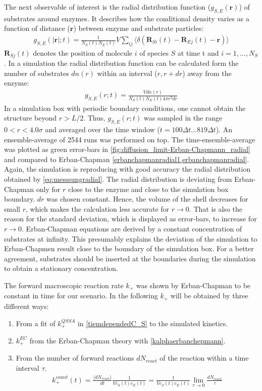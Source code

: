 \documentclass[
  a4paper,BCOR10mm,twoside,
  headsepline,footsepline,%
  fleqn,openbib
]{scrbook}
\begin{document}
The next observable of interest is the radial distribution function ($g_{S,E}(\bm{r})$) of substrates around enzymes. It describes how the conditional density varies as a function of distance ($\bm{r}$) between enzyme and substrate particles:  
\begin{align}
 g_{S,E}(|\bm{r}|;t)=\frac{1}{ N_S (t) N_E(t)} V \sum_{ij} \langle \delta(\bm{R}_{S i}(t)-\bm{R}_{E j}(t)-\bm{r})\rangle
\end{align}
 $\bm{R}_{S j}(t)$ denotes the position of molecule $i$ of species $S$ at time t and $i=1,...,N_{S}$.
In a simulation the radial distribution function can be calculated form the number of substrates $dn(r)$ within an interval ($r,r+dr$) away from the enzyme:
\begin{align} 
 g_{S,E}(r;t)=\frac{V dn(r)}{  N_S (t) N_E(t) 4\pi r^2 dr} \label{eq:messsungradial}
\end{align}
In a simulation box with periodic boundary conditions, one cannot obtain the structure beyond $r>L/2$. Thus, $g_{S,E}(r;t)$ was sampled in the range $0 <r<4.0 \sigma$ and averaged over the time window ($t=100 \Delta t ...819 \Delta t$). An ensemble-average of 2544 runs was performed on top. The time-ensemble-average was plotted as green error-bars in \cref{fig:diffusion_limit-Erban-Chapmann_radial} and compared to Erban-Chapman \cref{erbanchapmanradial1,erbanchapmanradial}. Again, the simulation is reproducing with good accuracy the radial distribution obtained by \cref{eq:messsungradial}. The radial distribution is deviating from Erban-Chapman only for $r$ close to the enzyme and close to the simulation box boundary. $dr$ was chosen constant. Hence, the volume of the shell decreases for small $r$, which makes the calculation less accurate for $r\rightarrow 0$. That is also the reason for the standard deviation, which is displayed as error-bars, to increase for $r\rightarrow 0$.  Erban-Chapman equations are derived by a constant concentration of substrates at infinity. This presumably explains the deviation of the simulation to Erban-Chapmen result close to the boundary of the simulation box. For a better agreement, substrates should be inserted at the boundaries during the simulation to obtain a stationary concentration. 
\par 
The forward macroscopic reaction rate $k_+$ was shown by Erban-Chapman to be constant in time for our scenario. In the following $k_+$ will be obtained by three different ways:
\begin{enumerate}
 \item From a fit of $k^{QSSA}_+$ in \cref{tiemdependedC_S} to the simulated kinetics.
 \item $k^{EC}_+$ from the Erban-Chapman theory with \cref{kalphaerbanchepmann}.
 \item From the number of forward reactions $dN_{react}$ of the reaction  within a time interval $\tau$.  
 \begin{align} \label{reactioncount}
  k^{count}_+(t)=\frac{ \langle dN_{react}\rangle}{dt}\frac{1}{V c_S(t) c_E(t)}= \frac{1}{V c_S(t) c_E(t)} \lim_{\tau \to 0} \frac{dN_{react}}{\tau}
 \end{align}
\end{enumerate}
\end{document}
